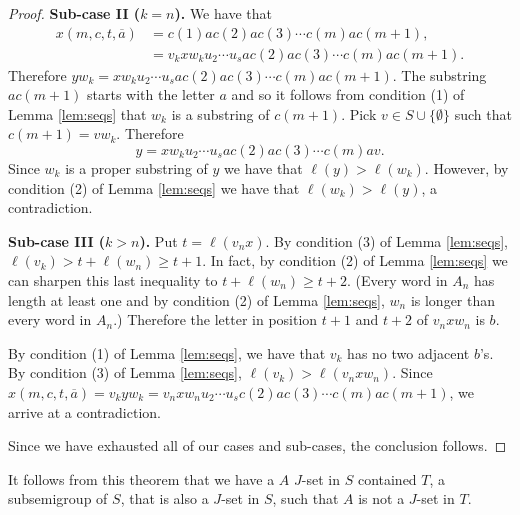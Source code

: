 \begin{proof}
  \textbf{Sub-case II ($k = n$).}
  We have that
  \begin{align*}
    x(m, c, t, \overline{a}) &= c(1)ac(2)ac(3) \cdots c(m)ac(m+1), \\
                             &= v_kxw_ku_2 \cdots u_sac(2)ac(3) \cdots c(m)ac(m+1).
  \end{align*}
  Therefore $yw_k = xw_ku_2 \cdots u_sac(2)ac(3) \cdots c(m)ac(m+1)$. 
  The substring $ac(m+1)$ starts with the letter $a$ and so it follows from condition (1) of Lemma \ref{lem:seqs} that $w_k$ is a substring of $c(m+1)$.
  Pick $v \in S \cup \{\emptyset\}$ such that $c(m+1) = vw_k$. 
  Therefore 
  \[
    y = xw_ku_2 \cdots u_sac(2)ac(3) \cdots c(m)av.
  \]
  Since $w_k$ is a proper substring of $y$ we have that $\ell(y) > \ell(w_k)$.
  However, by condition (2) of Lemma \ref{lem:seqs} we have that $\ell(w_k) > \ell(y)$, a contradiction. 

  \textbf{Sub-case III ($k > n$).}
  Put $t = \ell(v_nx)$.
  By condition (3) of Lemma \ref{lem:seqs}, $\ell(v_k) > t + \ell(w_n) \ge t+1$.
  In fact, by condition (2) of Lemma \ref{lem:seqs} we can sharpen this last inequality to $t + \ell(w_n) \ge t+2$.
  (Every word in $A_n$ has length at least one and by condition (2) of Lemma \ref{lem:seqs}, $w_n$ is longer than every word in $A_n$.)
  Therefore the letter in position $t+1$ and $t+2$ of $v_nxw_n$ is $b$. 

  By condition (1) of Lemma \ref{lem:seqs}, we have that $v_k$ has no two adjacent $b$'s. 
  By condition (3) of Lemma \ref{lem:seqs}, $\ell(v_k) > \ell(v_nxw_n)$. 
  Since $x(m, c, t, \overline{a}) = v_kyw_k = v_nxw_nu_2 \cdots u_sc(2) ac(3)\cdots c(m)ac(m+1)$, we arrive at a contradiction.

  Since we have exhausted all of our cases and sub-cases, the conclusion follows.
\end{proof}

It follows from this theorem that we have a $A$ $J$-set in $S$ contained $T$, a subsemigroup of $S$, that is also a $J$-set in $S$, such that $A$ is not a $J$-set in $T$.
